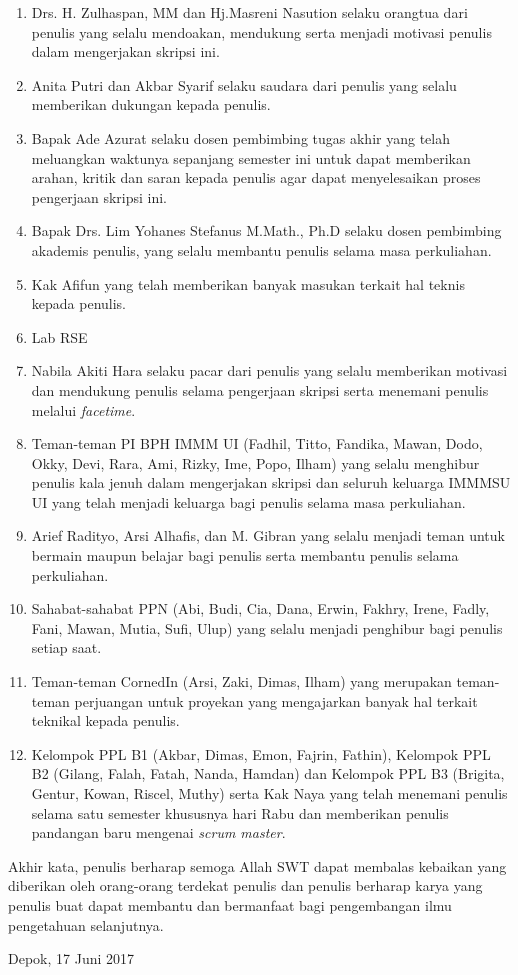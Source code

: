 \begin{enumerate}
\item Drs. H. Zulhaspan, MM dan Hj.Masreni Nasution selaku orangtua dari penulis yang selalu mendoakan, mendukung serta menjadi motivasi penulis dalam mengerjakan skripsi ini.
\item Anita Putri dan Akbar Syarif selaku saudara dari penulis yang selalu memberikan dukungan kepada penulis.
\item Bapak Ade Azurat selaku dosen pembimbing tugas akhir yang telah meluangkan waktunya sepanjang semester ini untuk dapat memberikan arahan, kritik dan saran kepada penulis agar dapat menyelesaikan proses pengerjaan skripsi ini.
\item Bapak Drs. Lim Yohanes Stefanus M.Math., Ph.D selaku dosen pembimbing akademis penulis, yang selalu membantu penulis selama masa perkuliahan.
\item Kak Afifun yang telah memberikan banyak masukan terkait hal teknis kepada penulis.
\item Lab RSE
\item Nabila Akiti Hara selaku pacar dari penulis yang selalu memberikan motivasi dan mendukung penulis selama pengerjaan skripsi serta menemani penulis melalui \textit{facetime}.
\item Teman-teman PI BPH IMMM UI (Fadhil, Titto, Fandika, Mawan, Dodo, Okky, Devi, Rara, Ami, Rizky, Ime, Popo, Ilham) yang selalu menghibur penulis kala jenuh dalam mengerjakan skripsi dan seluruh keluarga IMMMSU UI yang telah menjadi keluarga bagi penulis selama masa perkuliahan.
\item Arief Radityo, Arsi Alhafis, dan M. Gibran yang selalu menjadi teman untuk bermain maupun belajar bagi penulis serta membantu penulis selama perkuliahan.
\item Sahabat-sahabat PPN (Abi, Budi, Cia, Dana, Erwin, Fakhry, Irene, Fadly, Fani, Mawan, Mutia, Sufi, Ulup) yang selalu menjadi penghibur bagi penulis setiap saat.
\item Teman-teman CornedIn (Arsi, Zaki, Dimas, Ilham) yang merupakan teman-teman perjuangan untuk proyekan yang mengajarkan banyak hal terkait teknikal kepada penulis.
\item Kelompok PPL B1 (Akbar, Dimas, Emon, Fajrin, Fathin), Kelompok PPL B2 (Gilang, Falah, Fatah, Nanda, Hamdan) dan Kelompok PPL B3 (Brigita, Gentur, Kowan, Riscel, Muthy) serta Kak Naya yang telah menemani penulis selama satu semester khususnya hari Rabu dan memberikan penulis pandangan baru mengenai \textit{scrum master}.
\end{enumerate}

Akhir kata, penulis berharap semoga Allah SWT dapat membalas kebaikan yang diberikan oleh orang-orang terdekat penulis dan penulis berharap karya yang penulis buat dapat membantu dan bermanfaat bagi pengembangan ilmu pengetahuan selanjutnya.

\vspace*{0.1cm}
\begin{flushright}
Depok, 17 Juni 2017\\[0.1cm]
\vspace*{1cm}
\penulis

\end{flushright}
